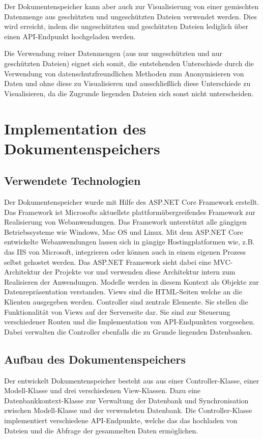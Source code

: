 \documentclass[
    fontsize=12pt,
    headings=small,
    parskip=half,           %
    bibliography=totoc,
    numbers=noenddot,       %
    open=any,               %
    ]{scrreprt}
\begin{document}
Der Dokumentenspeicher kann aber auch zur Visualisierung von einer gemischten Datenmenge aus geschützten und ungeschützten Dateien verwendet werden. Dies wird erreicht, indem die ungeschützten und geschützten Dateien lediglich über einen API-Endpunkt hochgeladen werden.

Die Verwendung reiner Datenmengen (aus nur ungeschützten und nur geschützten Dateien) eignet sich somit, die entstehenden Unterschiede durch die Verwendung von datenschutzfreundlichen Methoden zum Anonymisieren von Daten und ohne diese zu Visualisieren und ausschließlich diese Unterschiede zu Visualisieren, da die Zugrunde liegenden Dateien sich sonst nicht unterscheiden. 

\newpage
    \section{Implementation des Dokumentenspeichers}    
    
    \subsection{Verwendete Technologien}
Der Dokumentenspeicher wurde mit Hilfe des ASP.NET Core Framework erstellt. 
Das Framework ist Microsofts aktuellste plattformübergreifendes Framework zur Realisierung von Webanwendungen.
Das Framework unterstützt alle gängigen Betriebssysteme wie Windows, Mac OS und Linux.
Mit dem ASP.NET Core entwickelte Webanwendungen lassen sich in gängige Hostingplatformen wie, z.B. das IIS von Microsoft, integrieren oder können auch in einem eigenen Prozess selbst gehostet werden. 
Das ASP.NET Framework sieht dabei eine MVC-Architektur der Projekte vor und verwenden diese Architektur intern zum Realisieren der Anwendungen. 
Modelle werden in diesem Kontext als Objekte zur Datenrepräsentation verstanden. 
Views sind die HTML-Seiten welche an die Klienten ausgegeben werden.
Controller sind zentrale Elemente. 
Sie stellen die Funktionalität von Views auf der Serverseite dar.
Sie sind zur Steuerung verschiedener Routen und die Implementation von API-Endpunkten vorgesehen.
Dabei verwalten die Controller ebenfalls die zu Grunde liegenden Datenbanken.
    \subsection{Aufbau des Dokumentenspeichers}

Der entwickelt Dokumentenspeicher besteht aus aus einer Controller-Klasse, einer Modell-Klasse und drei verschiedenen View-Klassen.
Dazu eine Datenbankkontext-Klasse zur Verwaltung der Datenbank und Synchronisation zwischen Modell-Klasse und der verwendeten Datenbank.
Die Controller-Klasse implementiert verschiedene API-Endpunkte, welche das das hochladen von Dateien und die Abfrage der gesammelten Daten ermöglichen.
\end{document}
